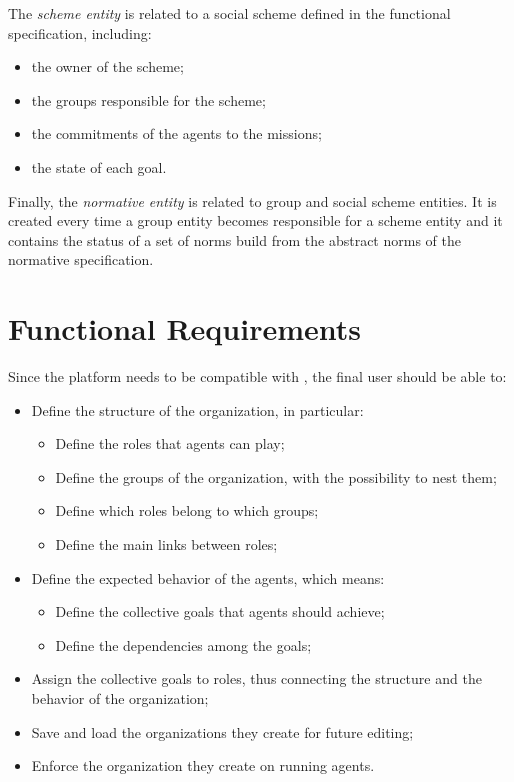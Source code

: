 The \textit{scheme entity} is related to a social scheme defined in the functional specification, including:
\begin{itemize}
    \item the owner of the scheme;
    \item the groups responsible for the scheme;
    \item the commitments of the agents to the missions;
    \item the state of each goal.
\end{itemize}

Finally, the \textit{normative entity} is related to group and social scheme entities.
It is created every time a group entity becomes responsible for a scheme entity and it contains the status of a set of norms build from the abstract norms of the normative specification.

\section{Functional Requirements}
Since the platform needs to be compatible with \moise{}, the final user should be able to:
\begin{itemize}
    \item Define the structure of the organization, in particular:
    \begin{itemize}
        \item Define the roles that agents can play;
        \item Define the groups of the organization, with the possibility to nest them;
        \item Define which roles belong to which groups;
        \item Define the main links between roles;
    \end{itemize}
    \item Define the expected behavior of the agents, which means:
    \begin{itemize}
        \item Define the collective goals that agents should achieve;
        \item Define the dependencies among the goals;
    \end{itemize}
    \item Assign the collective goals to roles, thus connecting the structure and the behavior of the organization;
    \item Save and load the organizations they create for future editing;
    \item Enforce the organization they create on running agents.
\end{itemize}

